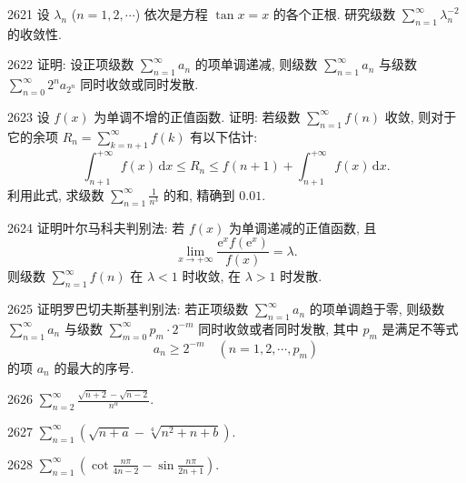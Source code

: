 \begin{prob}[M]{2621}
设 $\lambda_n$ ($n = 1, 2, \cdots$) 依次是方程 $\tan x = x$ 的各个正根. 研究级数 $\sum_{n=1}^{\infty} \lambda_n^{-2}$ 的收敛性.
\end{prob}

\begin{prob}[M]{2622}
证明: 设正项级数 $\sum_{n=1}^{\infty} a_n$ 的项单调递减, 则级数 $\sum_{n=1}^{\infty} a_n$ 与级数 $\sum_{n=0}^{\infty} 2^n a_{2^n}$ 同时收敛或同时发散.
\end{prob}

\begin{prob}[M]{2623}
设 $f(x)$ 为单调不增的正值函数. 证明: 若级数 $\sum_{n=1}^{\infty} f(n)$ 收敛, 则对于它的余项 $R_n = \sum_{k=n+1}^{\infty} f(k)$ 有以下估计:
\[
\int_{n+1}^{+\infty} f(x)\,\mathrm{d}x \leqslant R_n \leqslant f(n+1) + \int_{n+1}^{+\infty} f(x)\,\mathrm{d}x.
\]
利用此式, 求级数 $\sum_{n=1}^{\infty} \frac{1}{n^3}$ 的和, 精确到 $0.01$.
\end{prob}

\begin{prob}[M]{2624}
证明叶尔马科夫判别法: 若 $f(x)$ 为单调递减的正值函数, 且
\[
\lim_{x\to+\infty} \frac{\mathrm{e}^x f(\mathrm{e}^x)}{f(x)} = \lambda.
\]
则级数 $\sum_{n=1}^{\infty} f(n)$ 在 $\lambda < 1$ 时收敛, 在 $\lambda > 1$ 时发散.
\end{prob}

\begin{prob}[M]{2625}
证明罗巴切夫斯基判别法: 若正项级数 $\sum_{n=1}^{\infty} a_n$ 的项单调趋于零, 则级数 $\sum_{n=1}^{\infty} a_n$ 与级数 $\sum_{m=0}^{\infty} p_m \cdot 2^{-m}$ 同时收敛或者同时发散, 其中 $p_m$ 是满足不等式
\[
a_n \geqslant 2^{-m} \quad (n = 1, 2, \cdots, p_m)
\]
的项 $a_n$ 的最大的序号.
\end{prob}


\begin{prob}[S]{2626}
$\sum_{n=2}^{\infty} \frac{\sqrt{n+2} - \sqrt{n-2}}{n^{\alpha}}$.
\end{prob}

\begin{prob}[S]{2627}
$\sum_{n=1}^{\infty} (\sqrt{n+a} - \sqrt[4]{n^2+n+b})$.
\end{prob}

\begin{prob}[S]{2628}
$\sum_{n=1}^{\infty} \left(\cot \frac{n\pi}{4n-2} - \sin \frac{n\pi}{2n+1}\right)$.
\end{prob}

